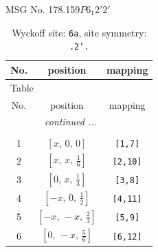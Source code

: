 \documentclass[fleqn,8pt]{jsarticle}
\begin{document}
\setcounter{MaxMatrixCols}{32}

\renewcommand{\tablename}{Table~}
\renewcommand{\figurename}{Figure~}
\begin{center}
\LARGE
MSG No. 178.159\quad$P6_{1}2'2'$
\end{center}
\renewcommand{\arraystretch}{1.2}
\begin{longtable}{ccc}
\caption{Wyckoff site: {\tt 6a}, site symmetry: {\tt .2'.}}
 \\
 \hline \hline
No. & position & mapping \\ \hline \endfirsthead

\multicolumn{2}{l}{\tablename\ \thetable{}} \\
 \hline \hline
No. & position & mapping \\ \hline \endhead

 \hline \hline
\multicolumn{2}{r}{\footnotesize\it continued ...} \\ \endfoot

 \hline \hline
\multicolumn{2}{r}{} \\ \endlastfoot

1 & $\left[ x,\, 0,\, 0 \right]$ & {\tt [1,7]} \\ \hline
2 & $\left[ x,\, x,\, \frac{1}{6} \right]$ & {\tt [2,10]} \\ \hline
3 & $\left[ 0,\, x,\, \frac{1}{3} \right]$ & {\tt [3,8]} \\ \hline
4 & $\left[ - x,\, 0,\, \frac{1}{2} \right]$ & {\tt [4,11]} \\ \hline
5 & $\left[ - x,\, - x,\, \frac{2}{3} \right]$ & {\tt [5,9]} \\ \hline
6 & $\left[ 0,\, - x,\, \frac{5}{6} \right]$ & {\tt [6,12]} \\
\end{longtable}
\renewcommand{\arraystretch}{1.2}
\end{document}

